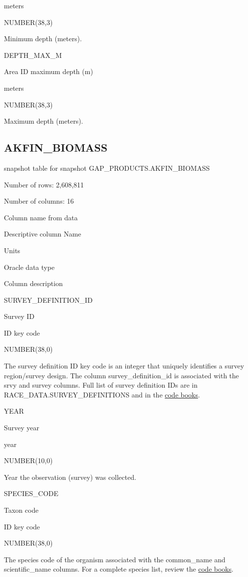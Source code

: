 \documentclass[
  letterpaper,
  oneside,
  open=any]{scrbook}
\begin{document}
meters

NUMBER(38,3)

Minimum depth (meters).

DEPTH\_MAX\_M

Area ID maximum depth (m)

meters

NUMBER(38,3)

Maximum depth (meters).

\subsection{AKFIN\_BIOMASS}\label{akfin_biomass}

snapshot table for snapshot GAP\_PRODUCTS.AKFIN\_BIOMASS

Number of rows: 2,608,811

Number of columns: 16

Column name from data

Descriptive column Name

Units

Oracle data type

Column description

SURVEY\_DEFINITION\_ID

Survey ID

ID key code

NUMBER(38,0)

The survey definition ID key code is an integer that uniquely identifies
a survey region/survey design. The column survey\_definition\_id is
associated with the srvy and survey columns. Full list of survey
definition IDs are in RACE\_DATA.SURVEY\_DEFINITIONS and in the
\href{https://www.fisheries.noaa.gov/resource/document/groundfish-survey-species-code-manual-and-data-codes-manual}{code
books}.

YEAR

Survey year

year

NUMBER(10,0)

Year the observation (survey) was collected.

SPECIES\_CODE

Taxon code

ID key code

NUMBER(38,0)

The species code of the organism associated with the common\_name and
scientific\_name columns. For a complete species list, review the
\href{https://www.fisheries.noaa.gov/resource/document/groundfish-survey-species-code-manual-and-data-codes-manual}{code
books}.
\end{document}
